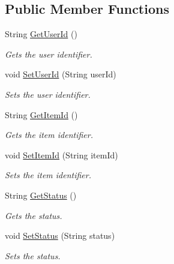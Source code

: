 \subsection*{Public Member Functions}
\begin{DoxyCompactItemize}
\item 
String \hyperlink{classcom_1_1shephertz_1_1app42_1_1paas_1_1sdk_1_1csharp_1_1review_1_1_review_ab3cbe6654b357fb5bad6d0e855bdc487}{Get\+User\+Id} ()
\begin{DoxyCompactList}\small\item\em Gets the user identifier. \end{DoxyCompactList}\item 
void \hyperlink{classcom_1_1shephertz_1_1app42_1_1paas_1_1sdk_1_1csharp_1_1review_1_1_review_a62f9a68ffe2be267cda59b4abb117d42}{Set\+User\+Id} (String user\+Id)
\begin{DoxyCompactList}\small\item\em Sets the user identifier. \end{DoxyCompactList}\item 
String \hyperlink{classcom_1_1shephertz_1_1app42_1_1paas_1_1sdk_1_1csharp_1_1review_1_1_review_a5121db2b50185657d6987aca35842c47}{Get\+Item\+Id} ()
\begin{DoxyCompactList}\small\item\em Gets the item identifier. \end{DoxyCompactList}\item 
void \hyperlink{classcom_1_1shephertz_1_1app42_1_1paas_1_1sdk_1_1csharp_1_1review_1_1_review_a77e96cccde2be8b340d2b759f27c9552}{Set\+Item\+Id} (String item\+Id)
\begin{DoxyCompactList}\small\item\em Sets the item identifier. \end{DoxyCompactList}\item 
String \hyperlink{classcom_1_1shephertz_1_1app42_1_1paas_1_1sdk_1_1csharp_1_1review_1_1_review_a16e0b03ee9e748911db4182c8555e20d}{Get\+Status} ()
\begin{DoxyCompactList}\small\item\em Gets the status. \end{DoxyCompactList}\item 
void \hyperlink{classcom_1_1shephertz_1_1app42_1_1paas_1_1sdk_1_1csharp_1_1review_1_1_review_a7efed288eb80556ce8bf97d2a2e0bedb}{Set\+Status} (String status)
\begin{DoxyCompactList}\small\item\em Sets the status. \end{DoxyCompactList}\item 

\end{DoxyCompactItemize}
